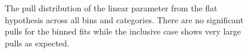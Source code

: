 \begin{figure}[h!]
  \centering
  ~~
  \\
  ~~
  \\
  \caption{\label{fig:frenchFlagPulls13} The pull distribution of the linear parameter from the flat hypothesis across all
  \scalht bins and categories. There are no significant pulls for the \scalht binned
  fits while the \scalht inclusive case shows very large pulls as expected. 
  }
\end{figure}
